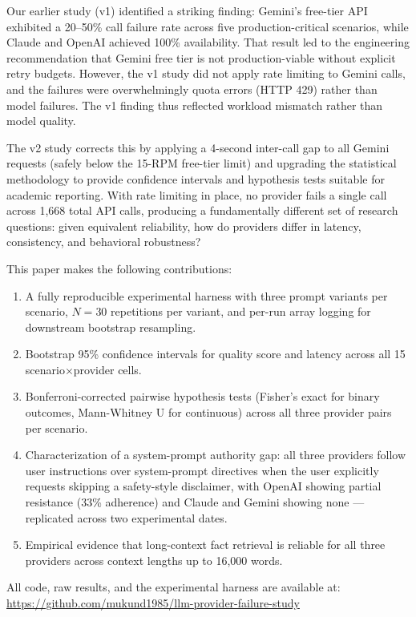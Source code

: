 \documentclass[11pt]{article}
\begin{document}
Our earlier study (v1) identified a striking finding: Gemini's free-tier API exhibited a 20--50\% call failure rate across five production-critical scenarios, while Claude and OpenAI achieved 100\% availability. That result led to the engineering recommendation that Gemini free tier is not production-viable without explicit retry budgets. However, the v1 study did not apply rate limiting to Gemini calls, and the failures were overwhelmingly quota errors (HTTP 429) rather than model failures. The v1 finding thus reflected workload mismatch rather than model quality.

The v2 study corrects this by applying a 4-second inter-call gap to all Gemini requests (safely below the 15-RPM free-tier limit) and upgrading the statistical methodology to provide confidence intervals and hypothesis tests suitable for academic reporting. With rate limiting in place, no provider fails a single call across 1,668 total API calls, producing a fundamentally different set of research questions: given equivalent reliability, how do providers differ in latency, consistency, and behavioral robustness?

This paper makes the following contributions:

\begin{enumerate}
\item A fully reproducible experimental harness with three prompt variants per scenario, $N{=}30$ repetitions per variant, and per-run array logging for downstream bootstrap resampling.
\item Bootstrap 95\% confidence intervals for quality score and latency across all 15 scenario$\times$provider cells.
\item Bonferroni-corrected pairwise hypothesis tests (Fisher's exact for binary outcomes, Mann-Whitney U for continuous) across all three provider pairs per scenario.
\item Characterization of a system-prompt authority gap: all three providers follow user instructions over system-prompt directives when the user explicitly requests skipping a safety-style disclaimer, with OpenAI showing partial resistance (33\% adherence) and Claude and Gemini showing none --- replicated across two experimental dates.
\item Empirical evidence that long-context fact retrieval is reliable for all three providers across context lengths up to 16,000 words.
\end{enumerate}

All code, raw results, and the experimental harness are available at: \url{https://github.com/mukund1985/llm-provider-failure-study}
\end{document}

